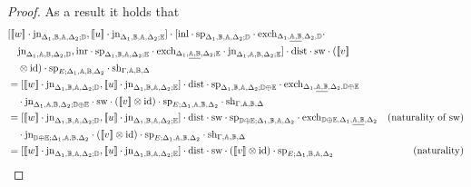 \documentclass[10pt,a4paper]{amsart}
\theoremstyle{definition}
\theoremstyle{definition}
\theoremstyle{definition}
\theoremstyle{definition}
\theoremstyle{definition}
\theoremstyle{definition}
\begin{document}
\begin{proof}
As a result it holds that 
\begin{align*}
  & [[\![ w ]\!] \cdot \text{jn}_{\Delta_{1} ,\typeB,\typeA,  \Delta_{2};\typeD},  [\![u ]\!] \cdot \text{jn}_{\Delta_{1} ,\typeB,\typeA,  \Delta_{2};\typeE}] \cdot [\inl \cdot  \text{sp}_{\Delta_{1}, \typeB, \typeA, \Delta_{2};\typeD} \cdot  \text{exch}_{\Delta_{1},\underline{\typeA,\typeB},  \Delta_{2},\typeD} \cdot   \\
  & \hspace{10pt}  \text{jn}_{\Delta_{1},\typeA,\typeB,  \Delta_{2},\typeD}, \inr \cdot  \text{sp}_{\Delta_{1}, \typeB, \typeA, \Delta_{2};\typeE} \cdot  \text{exch}_{\Delta_{1},\underline{\typeA,\typeB},  \Delta_{2};\typeE} \cdot  \text{jn}_{\Delta_{1},\typeA,\typeB,  \Delta_{2};\typeE} ] \cdot \text{dist} \cdot \text{sw} \cdot ([\![  v   ]\!] \\
  & \hspace{10pt} \otimes \text{id})  \cdot\text{sp}_{E; \Delta_{1},\typeA,\typeB,  \Delta_{2}} \cdot \text{sh}_{\Gamma,\typeA, \typeB,\Delta} \\ 
  & = [[\![ w ]\!] \cdot \text{jn}_{\Delta_{1} ,\typeB,\typeA,  \Delta_{2};\typeD},  [\![u ]\!] \cdot \text{jn}_{\Delta_{1} ,\typeB,\typeA,  \Delta_{2};\typeE}] \cdot \text{dist} \cdot \text{sp}_{\Delta_{1}, \typeB, \typeA, \Delta_{2}; \typeD \oplus\typeE} \cdot  \text{exch}_{\Delta_{1},\underline{\typeA,\typeB},  \Delta_{2}, \typeD \oplus\typeE}\\
  & \hspace{10pt}  \cdot  \text{jn}_{\Delta_{1},\typeA,\typeB,  \Delta_{2}; \typeD \oplus\typeE}  \cdot \text{sw} \cdot ([\![  v ]\!] \otimes \text{id})  \cdot\text{sp}_{E; \Delta_{1},\typeA,\typeB,  \Delta_{2}} \cdot \text{sh}_{\Gamma,\typeA, \typeB,\Delta}\\
  & = [[\![ w ]\!] \cdot \text{jn}_{\Delta_{1} ,\typeB,\typeA,  \Delta_{2};\typeD},  [\![u ]\!] \cdot \text{jn}_{\Delta_{1} ,\typeB,\typeA,  \Delta_{2};\typeE}] \cdot \text{dist} \cdot \text{sw} \cdot \text{sp}_{\typeD \oplus\typeE;\Delta_{1}, \typeB, \typeA, \Delta_{2}} \cdot  \text{exch}_{\typeD \oplus\typeE, \Delta_{1},\underline{\typeA,\typeB},  \Delta_{2}} & {\text{(naturality of sw)}} \\
  & \hspace{10pt} \cdot  \text{jn}_{\typeD \oplus\typeE;\Delta_{1},\typeA,\typeB,  \Delta_{2}} \cdot ([\![  v  ]\!] \otimes \text{id})  \cdot\text{sp}_{E; \Delta_{1},\typeA,\typeB,  \Delta_{2}} \cdot \text{sh}_{\Gamma,\typeA, \typeB,\Delta} \\
  & = [[\![ w ]\!] \cdot \text{jn}_{\Delta_{1} ,\typeB,\typeA,  \Delta_{2};\typeD},  [\![u ]\!] \cdot \text{jn}_{\Delta_{1} ,\typeB,\typeA,  \Delta_{2};\typeE}] \cdot \text{dist} \cdot \text{sw} \cdot ([\![  v  ]\!] \otimes \text{id}) \cdot \text{sp}_{E;\Delta_{1}, \typeB, \typeA, \Delta_{2}} & {\text{(naturality)}} \\

\end{align*}
\end{proof}
\end{document}
